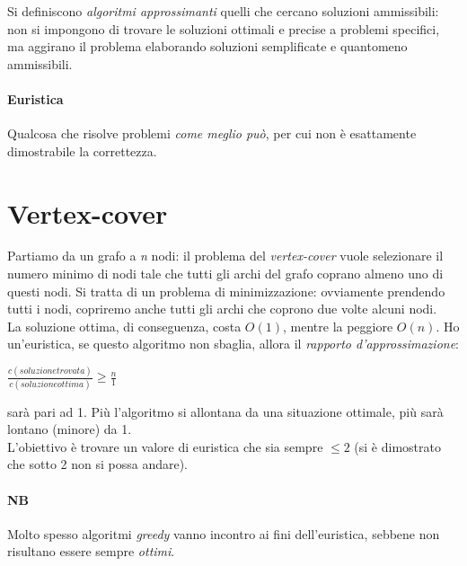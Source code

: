Si definiscono \textit{algoritmi approssimanti} quelli che cercano soluzioni ammissibili: non si impongono di trovare le soluzioni ottimali e precise a problemi specifici, ma aggirano il problema elaborando soluzioni semplificate e quantomeno ammissibili.

\paragraph{Euristica}
Qualcosa che risolve problemi \textit{come meglio può}, per cui non è esattamente dimostrabile la correttezza.

\section{Vertex-cover}
Partiamo da un grafo a \textit{n} nodi: il problema del \textit{vertex-cover} vuole selezionare il numero minimo di nodi tale che tutti gli archi del grafo coprano almeno uno di questi nodi.
Si tratta di un problema di minimizzazione: ovviamente prendendo tutti i nodi, copriremo anche tutti gli archi che coprono due volte alcuni nodi. \\
La soluzione ottima, di conseguenza, costa $O(1)$, mentre la peggiore $O(n)$.
Ho un'euristica, se questo algoritmo non sbaglia, allora il \textit{rapporto d'approssimazione}:
\begin{center}
	$\frac{c(soluzione trovata)}{c(soluzione ottima)} \geq \frac{n}{1}$
\end{center}
sarà pari ad 1. Più l'algoritmo si allontana da una situazione ottimale, più sarà lontano (minore) da 1. \\
L'obiettivo è trovare un valore di euristica che sia sempre $\leq 2$ (si è dimostrato che sotto 2 non si possa andare).

\paragraph{NB}
Molto spesso algoritmi \textit{greedy} vanno incontro ai fini dell'euristica, sebbene non risultano essere sempre \textit{ottimi}. \\ \\

